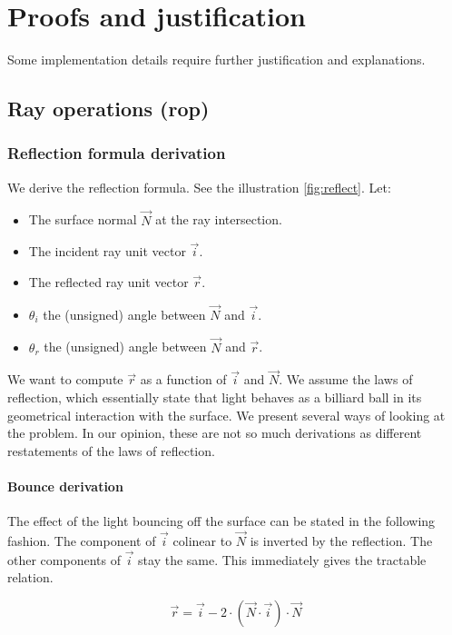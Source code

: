 \section{Proofs and justification}
\label{sec:justification}

Some implementation details require further justification and explanations.

\subsection{Ray operations (rop)}
\subsubsection{Reflection formula derivation}
We derive the reflection formula. See the illustration \cref{fig:reflect}.
Let: \begin{itemize}
\item The surface normal $\overrightarrow{N}$ at the ray intersection.
\item The incident ray unit vector $\overrightarrow{i}$.
\item The reflected ray unit vector $\overrightarrow{r}$.
\item $\theta_i$ the (unsigned) angle between $\overrightarrow{N}$ and
      $\overrightarrow{i}$.
\item $\theta_r$ the (unsigned) angle between $\overrightarrow{N}$ and
      $\overrightarrow{r}$.
\end{itemize}

We want to compute $\overrightarrow{r}$ as a function of $\overrightarrow{i}$
and $\overrightarrow{N}$.  We assume the laws of reflection, which essentially
state that light behaves as a billiard ball in its geometrical interaction with
the surface.  We present several ways of looking at the problem. In our
opinion, these are not so much derivations as different restatements of the
laws of reflection.

\paragraph{Bounce derivation}
The effect of the light bouncing off the surface can be stated in the following
fashion. The component of $\overrightarrow{i}$ colinear to $\overrightarrow{N}$
is inverted by the reflection. The other components of $\overrightarrow{i}$ stay
the same. This immediately gives the tractable relation.

\begin{equation}
\overrightarrow{r} = \overrightarrow{i} - 2 \cdot (\overrightarrow{N} \cdot
\overrightarrow{i}) \cdot \overrightarrow{N}
\end{equation}

